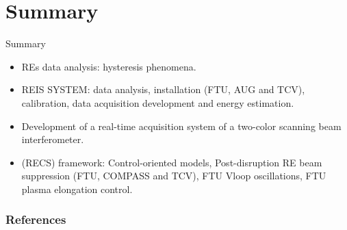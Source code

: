 \documentclass{beamer}
\begin{document}
\section{Summary}
\begin{frame}{Summary}
    \scriptsize
	\begin{itemize}
		\item REs data analysis: hysteresis phenomena.
    	\item REIS SYSTEM: data analysis, installation (FTU, AUG and TCV), calibration, data acquisition development and energy estimation.
		\item Development of a real-time acquisition system of a two-color scanning beam interferometer.
		\item (RECS) framework: Control-oriented models, Post-disruption RE beam suppression (FTU, COMPASS and TCV), FTU Vloop oscillations, FTU plasma elongation control.
	\end{itemize}
\end{frame}

\begin{frame}[allowframebreaks]
\frametitle{References}
\tiny


\end{frame}
\end{document}
